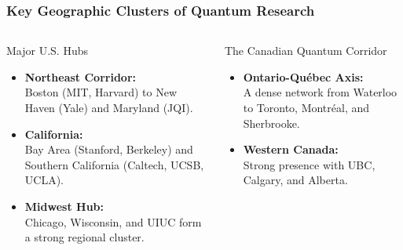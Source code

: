 \documentclass[aspectratio=169]{beamer}
\begin{document}
\begin{frame}
    \frametitle{Key Geographic Clusters of Quantum Research}
    
    \begin{columns}[T]
        \begin{column}{0.5\textwidth}
            \begin{block}{Major U.S. Hubs}
                \begin{itemize}
                    \item \textbf{Northeast Corridor:} \\ Boston (MIT, Harvard) to New Haven (Yale) and Maryland (JQI).
                    \vspace{1em}
                    \item \textbf{California:} \\ Bay Area (Stanford, Berkeley) and Southern California (Caltech, UCSB, UCLA).
                    \vspace{1em}
                    \item \textbf{Midwest Hub:} \\ Chicago, Wisconsin, and UIUC form a strong regional cluster.
                \end{itemize}
            \end{block}
        \end{column}
        \begin{column}{0.5\textwidth}
            \begin{block}{The Canadian Quantum Corridor}
                \begin{itemize}
                    \item \textbf{Ontario-Québec Axis:} \\ A dense network from Waterloo to Toronto, Montréal, and Sherbrooke.
                    \vspace{1em}
                    \item \textbf{Western Canada:} \\ Strong presence with UBC, Calgary, and Alberta.
                \end{itemize}
            \end{block}
        \end{column}
    \end{columns}
\end{frame}
\end{document}
